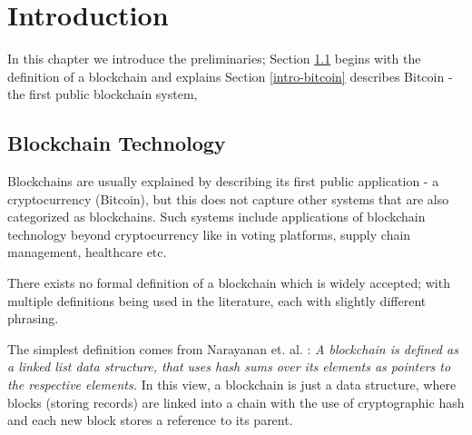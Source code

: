 \chapter{Introduction} \label{ch-intro}






In this chapter we introduce the preliminaries; 
Section \ref{intro-blockchain} begins with the definition of a blockchain and explains 
Section \ref{intro-bitcoin} describes Bitcoin - the first public blockchain system,


\section{Blockchain Technology} \label{intro-blockchain}

Blockchains are usually explained by describing its first public application - a cryptocurrency (Bitcoin), but this does not capture other systems that are also categorized as blockchains. Such systems include applications of blockchain technology beyond cryptocurrency like in voting platforms, supply chain management, healthcare etc.

There exists no formal definition of a blockchain which is widely accepted; with multiple definitions being used in the literature, each with slightly different phrasing. 

The simplest definition comes from Narayanan et. al. \cite{bitcoinBook}: 
\textit{
    A blockchain is defined as a linked list data structure, that uses hash sums over its elements as pointers to the respective elements.
}
In this view, a blockchain is just a data structure, where blocks (storing records) are linked into a chain with the use of cryptographic hash and each new block stores a reference to its parent.  


